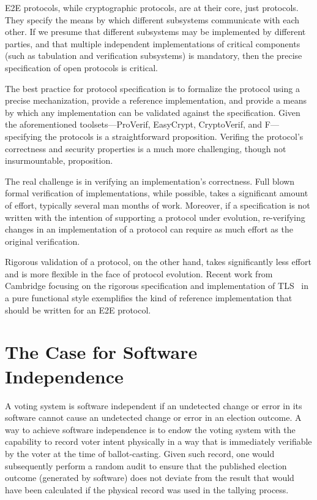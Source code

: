 E2E protocols, while cryptographic protocols, are at their core, just
protocols. They specify the means by which different subsystems
communicate with each other. If we presume that different subsystems
may be implemented by different parties, and that multiple independent
implementations of critical components (such as tabulation and
verification subsystems) is mandatory, then the precise specification
of open protocols is critical.

The best practice for protocol specification is to formalize the
protocol using a precise mechanization, provide a reference
implementation, and provide a means by which any implementation can be
validated against the specification. Given the aforementioned
toolsets---ProVerif, EasyCrypt, CryptoVerif, and F\*---specifying the
protocols is a straightforward proposition. Verifing the protocol's
correctness and security properties is a much more challenging, though
not insurmountable, proposition. 

The real challenge is in verifying an implementation's
correctness. Full blown formal verification of implementations, while
possible, takes a significant amount of effort, typically several man
months of work. Moreover, if a specification is not written with the
intention of supporting a protocol under evolution, re-verifying
changes in an implementation of a protocol can require as much effort
as the original verification.

Rigorous validation of a protocol, on the other hand, takes
significantly less effort and is more flexible in the face of protocol
evolution. Recent work from Cambridge focusing on the rigorous
specification and implementation of TLS~\cite{nqsb-TLS} in a pure
functional style exemplifies the kind of reference implementation that
should be written for an E2E protocol.

\section{The Case for Software Independence}

A voting system is software independent if an undetected change or
error in its software cannot cause an undetected change or error in an
election outcome.  A way to achieve software independence is to endow
the voting system with the capability to record voter intent
physically in a way that is immediately verifiable by the voter at the
time of ballot-casting. Given such record, one would subsequently
perform a random audit to ensure that the published election outcome
(generated by software) does not deviate from the result that would
have been calculated if the physical record was used in the tallying
process.

